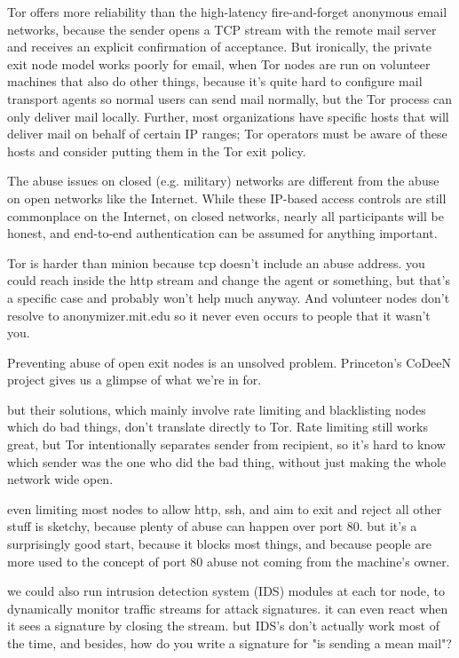 \documentclass[times,10pt,twocolumn]{article}
\begin{document}
Tor offers more reliability than the high-latency fire-and-forget
anonymous email networks, because the sender opens a TCP stream
with the remote mail server and receives an explicit confirmation of
acceptance. But ironically, the private exit node model works poorly for
email, when Tor nodes are run on volunteer machines that also do other
things, because it's quite hard to configure mail transport agents so
normal users can send mail normally, but the Tor process can only deliver
mail locally. Further, most organizations have specific hosts that will
deliver mail on behalf of certain IP ranges; Tor operators must be aware
of these hosts and consider putting them in the Tor exit policy.

The abuse issues on closed (e.g. military) networks are different
from the abuse on open networks like the Internet. While these IP-based
access controls are still commonplace on the Internet, on closed networks,
nearly all participants will be honest, and end-to-end authentication
can be assumed for anything important.

Tor is harder than minion because tcp doesn't include an abuse
address. you could reach inside the http stream and change the agent
or something, but that's a specific case and probably won't help
much anyway.
And volunteer nodes don't resolve to anonymizer.mit.edu so it never
even occurs to people that it wasn't you.

Preventing abuse of open exit nodes is an unsolved problem. Princeton's
CoDeeN project \cite{darkside} gives us a glimpse of what we're in for.

but their solutions, which mainly involve rate limiting and blacklisting
nodes which do bad things, don't translate directly to Tor. Rate limiting
still works great, but Tor intentionally separates sender from recipient,
so it's hard to know which sender was the one who did the bad thing,
without just making the whole network wide open.

even limiting most nodes to allow http, ssh, and aim to exit and reject
all other stuff is sketchy, because plenty of abuse can happen over
port 80. but it's a surprisingly good start, because it blocks most things,
and because people are more used to the concept of port 80 abuse not
coming from the machine's owner.

we could also run intrusion detection system (IDS) modules at each tor
node, to dynamically monitor traffic streams for attack signatures. it
can even react when it sees a signature by closing the stream. but IDS's
don't actually work most of the time, and besides, how do you write a
signature for "is sending a mean mail"?
\end{document}
